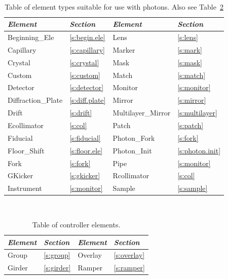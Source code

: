 \begin{table}[ht]
\centering
{\tt
\begin{tabular}{llll} \toprule
  {\it Element}      & {\it Section}         & {\it Element}         & {\it Section}       \\ \midrule
  Beginning_Ele      & \ref{s:begin.ele}     &    Lens               & \ref{s:lens}        \\
  Capillary          & \ref{s:capillary}     &  Marker               & \ref{s:mark}        \\
  Crystal            & \ref{s:crystal}       &  Mask                 & \ref{s:mask}        \\
  Custom             & \ref{s:custom}        &  Match                & \ref{s:match}       \\
  Detector           & \ref{s:detector}      &  Monitor              & \ref{s:monitor}     \\ 
  Diffraction_Plate  & \ref{s:diff.plate}    &  Mirror               & \ref{s:mirror}      \\
  Drift              & \ref{s:drift}         &  Multilayer_Mirror    & \ref{s:multilayer}  \\
  Ecollimator        & \ref{s:col}           &  Patch                & \ref{s:patch}       \\
  Fiducial           & \ref{s:fiducial}      &  Photon_Fork          & \ref{s:fork}        \\
  Floor_Shift        & \ref{s:floor.ele}     &  Photon_Init          & \ref{s:photon.init} \\
  Fork               & \ref{s:fork}          &  Pipe                 & \ref{s:monitor}     \\
  GKicker            & \ref{s:gkicker}       &  Rcollimator          & \ref{s:col}         \\
  Instrument         & \ref{s:monitor}       &  Sample               & \ref{s:sample}      \\
  \bottomrule
\end{tabular}
}
\caption{Table of element types suitable for use with photons. Also see Table~\ref{t:control.classes}}
\label{t:photon.classes}
\end{table}

\begin{table}[ht]
\centering
{\tt
\begin{tabular}{llll} \toprule
  {\it Element}  & {\it Section}     & {\it Element}  & {\it Section}    \\ \midrule
  Group          & \ref{s:group}     &  Overlay       & \ref{s:overlay}  \\
  Girder         & \ref{s:girder}    &  Ramper        & \ref{s:ramper}   \\ \bottomrule
\end{tabular}
}
\caption{Table of controller elements.}
\label{t:control.classes}
\end{table}


